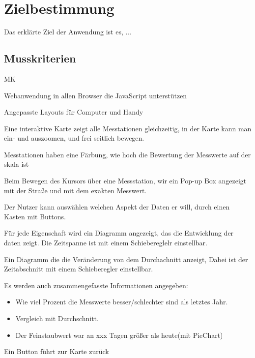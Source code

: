 \section{Zielbestimmung}
Das erklärte Ziel der Anwendung ist es, ...

\subsection{Musskriterien}
\setcounter{counter}{10}

\begin{Kriterien}{MK}

	\item Webanwendung in allen Browser die JavaScript unterstützen

	\item Angepasste Layouts für Computer und Handy
	
	\item Eine interaktive Karte zeigt alle Messtationen gleichzeitig, in der Karte kann man ein- und auszoomen, und frei seitlich bewegen.

	\item Messtationen haben eine Färbung, wie hoch die Bewertung der Messwerte auf der skala ist
	
	\item Beim Bewegen des Kursors über eine Messstation, wir ein Pop-up Box angezeigt mit der Straße und mit dem exakten Messwert.
	
	\item Der Nutzer kann auswählen welchen Aspekt der Daten er will, durch einen Kasten mit Buttons. 
	
	\item Für jede Eigenschaft wird ein Diagramm angezeigt, das die Entwicklung der daten zeigt. Die Zeitspanne ist mit einem Schiebereglelr einstellbar.
	
	\item Ein Diagramm die die Veränderung von dem Durchachnitt anzeigt, Dabei ist der Zeitabschnitt mit einem Schieberegler einstellbar.
	
	\item Es werden auch zusammengefasste Informationen angegeben: 
		\begin{itemize}
		 \item Wie viel Prozent die Messwerte besser/schlechter sind als letztes Jahr.
        \item Vergleich mit Durchschnitt.
        \item Der Feinstaubwert war an xxx Tagen größer als heute(mit PieChart)
		\end{itemize}
		
	\item Ein Button führt zur Karte zurück
 
\end{Kriterien}

